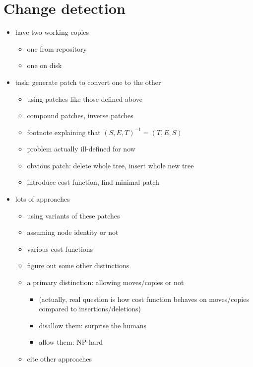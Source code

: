 \documentclass{article}
\begin{document}
\section{Change detection}
\begin{itemize}
    \item have two working copies
        \begin{itemize}
            \item one from repository
            \item one on disk
        \end{itemize}
    \item task: generate patch to convert one to the other
        \begin{itemize}
            \item using patches like those defined above
            \item compound patches, inverse patches
            \item footnote explaining that $(S,E,T)^{-1}=(T,E,S)$
            \item problem actually ill-defined for now
            \item obvious patch: delete whole tree, insert whole new tree
            \item introduce cost function, find minimal patch
        \end{itemize}
    \item lots of approaches
        \begin{itemize}
            \item using variants of these patches
            \item assuming node identity or not
            \item various cost functions
            \item figure out some other distinctions
            \item a primary distinction: allowing moves/copies or not
                \begin{itemize}
                    \item (actually, real question is how cost function
                        behaves on moves/copies compared to
                        insertions/deletions)
                    \item disallow them: surprise the humans
                    \item allow them: NP-hard
                \end{itemize}
            \item cite other approaches

\end{itemize}
\end{itemize}
\end{document}
